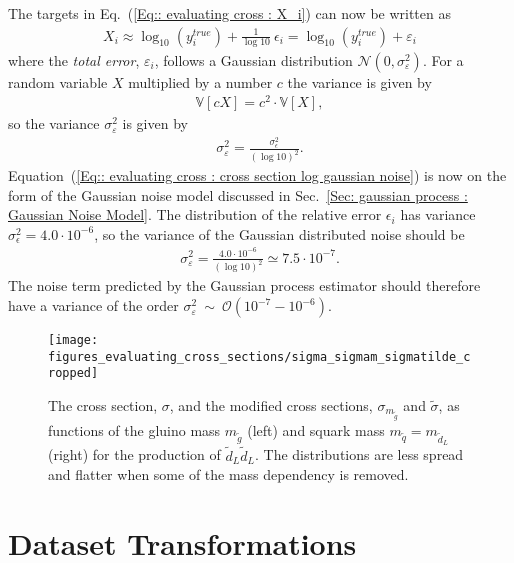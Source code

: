 \documentclass[twoside,english]{uiofysmaster}
\begin{document}
{{The targets in Eq.~(\ref{Eq:: evaluating cross : X_i}) can now be written as
\begin{align}\label{Eq:: evaluating cross : cross section log gaussian noise}
X_i \approx \log_{10}(y_i^{true}) + \frac{1}{\log 10} ~\epsilon_i = \log_{10}(y_i^{true}) + \varepsilon_i 
\end{align}
where the \textit{total error}, $\varepsilon_i$, follows a Gaussian distribution $\mathcal{N}(0, \sigma_{\varepsilon}^2)$. For a random variable $X$ multiplied by a number $c$ the variance is given by
\begin{align}
\mathbb{V}[c X] = c^2 \cdot \mathbb{V}[X],
\end{align}
so the variance $\sigma_{\varepsilon}^2$ is given by
\begin{align}
\sigma_{\varepsilon}^2 = \frac{\sigma_{\epsilon}^2}{(\log 10)^2}.
\end{align}
Equation~(\ref{Eq:: evaluating cross : cross section log gaussian noise}) is now on the form of the Gaussian noise model discussed in Sec.~\ref{Sec: gaussian process : Gaussian Noise Model}. The distribution of the relative error $\epsilon_i$ has variance $\sigma_{\epsilon}^2 = 4.0 \cdot 10^{-6}$, so the variance of the Gaussian distributed noise should be
\begin{align*}
\sigma_{\varepsilon}^2 =  \frac{4.0 \cdot 10^{-6}}{(\log 10)^2} \simeq 7.5 \cdot 10^{-7}.
\end{align*}
The noise term predicted by the Gaussian process estimator should therefore have a variance of the order $\sigma_{\varepsilon}^2~\sim~\mathcal{O}(10^{-7}- 10^{-6})$.

\begin{figure}
\texttt{[image: figures\_evaluating\_cross\_sections/sigma\_sigmam\_sigmatilde\_cropped]}
\caption[Plots of possible target values]{The cross section, $\sigma$, and the modified cross sections, $\sigma_{m_{\widetilde{g}}}$ and $\tilde{\sigma}$,  as functions of the gluino mass $m_{\widetilde{g}}$ (left) and squark mass $m_{\widetilde{q}} = m_{\widetilde{d}_L}$ (right) for the production of $\widetilde{d}_L \widetilde{d}_L$. The distributions are less spread and flatter when some of the mass dependency is removed.}
\label{Fig:: evaluating cross : Comparison sigma and sigma/m}
\end{figure}


\section{Dataset Transformations}\label{Sec:: evaluating cross : Dataset Transformations}

}}
\end{document}
